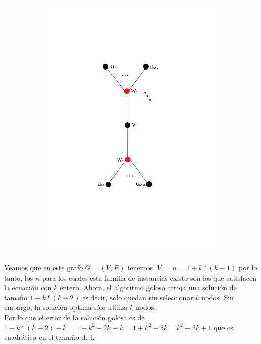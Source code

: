 \begin{figure}[H]
\centering
\begin{subfigure}[b]{0.5\textwidth}
                \includegraphics[width=\textwidth]{imagenes/grafos-ej3-tp3-3.png}
                \caption{}
        \end{subfigure}%
\end{figure}


Veamos que en este grafo $G=(V,E)$ tenemos $|V| = n = 1 + k*(k-1)$ por lo tanto, los $n$ para los cuales esta familia de instancias existe son los que satisfacen la ecuación con $k$ entero. Ahora, el algoritmo goloso arroja una solución de tamaño $1 + k*(k-2)$ es decir, solo quedan sin seleccionar $k$ nodos. Sin embargo, la solución optima sólo utiliza $k$ nodos.\\ 

Por lo que el error de la solución golosa es de $1 + k*(k-2) - k = 1 + k^2 -2k -k = 1 + k^2 - 3k = k^2 - 3k + 1$ que es cuadrático en el tamaño de k

